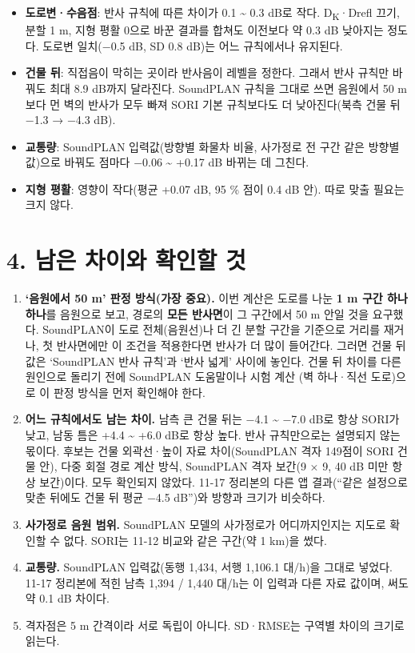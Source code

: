 \documentclass[10pt,a4paper]{article}
\newcommand{\hl}[1]{\textbf{#1}}
\begin{document}
\begin{itemize}
\item \hl{도로변·수음점}: 반사 규칙에 따른 차이가 0.1 \textasciitilde{} 0.3 dB로 작다. D\textsubscript{K}·Drefl 끄기, 분할 1 m, 지형 평활 0으로 바꾼 결과를 합쳐도 이전보다 약 0.3 dB 낮아지는 정도다.
도로변 일치(−0.5 dB, SD 0.8 dB)는 어느 규칙에서나 유지된다.
\item \hl{건물 뒤}: 직접음이 막히는 곳이라 반사음이 레벨을 정한다. 그래서 반사 규칙만 바꿔도 최대 8.9 dB까지 달라진다.
SoundPLAN 규칙을 그대로 쓰면 음원에서 50 m보다 먼 벽의 반사가 모두 빠져 SORI 기본 규칙보다도 더 낮아진다(북측 건물 뒤 −1.3 → −4.3 dB).
\item \hl{교통량}: SoundPLAN 입력값(방향별 화물차 비율, 사가정로 전 구간 같은 방향별 값)으로 바꿔도 점마다 −0.06 \textasciitilde{} +0.17 dB 바뀌는 데 그친다.
\item \hl{지형 평활}: 영향이 작다(평균 +0.07 dB, 95 \% 점이 0.4 dB 안). 따로 맞출 필요는 크지 않다.
\end{itemize}

\section*{4. 남은 차이와 확인할 것}
\begin{enumerate}
\item \hl{‘음원에서 50 m’ 판정 방식(가장 중요).} 이번 계산은 도로를 나눈 \hl{1 m 구간 하나하나}를 음원으로 보고, 경로의 \hl{모든 반사면}이 그 구간에서 50 m 안일 것을 요구했다.
SoundPLAN이 도로 전체(음원선)나 더 긴 분할 구간을 기준으로 거리를 재거나, 첫 반사면에만 이 조건을 적용한다면 반사가 더 많이 들어간다.
그러면 건물 뒤 값은 ‘SoundPLAN 반사 규칙’과 ‘반사 넓게’ 사이에 놓인다. 건물 뒤 차이를 다른 원인으로 돌리기 전에 SoundPLAN 도움말이나 시험 계산
(벽 하나·직선 도로)으로 이 판정 방식을 먼저 확인해야 한다.
\item \hl{어느 규칙에서도 남는 차이.} 남측 큰 건물 뒤는 −4.1 \textasciitilde{} −7.0 dB로 항상 SORI가 낮고, 남동 틈은 +4.4 \textasciitilde{} +6.0 dB로 항상 높다.
반사 규칙만으로는 설명되지 않는 몫이다. 후보는 건물 외곽선·높이 자료 차이(SoundPLAN 격자 149점이 SORI 건물 안), 다중 회절 경로 계산 방식,
SoundPLAN 격자 보간(9 × 9, 40 dB 미만 항상 보간)이다. 모두 확인되지 않았다.
11-17 정리본의 다른 앱 결과(“같은 설정으로 맞춘 뒤에도 건물 뒤 평균 −4.5 dB”)와 방향과 크기가 비슷하다.
\item \hl{사가정로 음원 범위.} SoundPLAN 모델의 사가정로가 어디까지인지는 지도로 확인할 수 없다. SORI는 11-12 비교와 같은 구간(약 1 km)을 썼다.
\item \hl{교통량.} SoundPLAN 입력값(동행 1,434, 서행 1,106.1 대/h)을 그대로 넣었다. 11-17 정리본에 적힌 남측 1,394 / 1,440 대/h는 이 입력과 다른 자료 값이며, 써도 약 0.1 dB 차이다.
\item 격자점은 5 m 간격이라 서로 독립이 아니다. SD·RMSE는 구역별 차이의 크기로 읽는다.
\end{enumerate}
\end{document}
